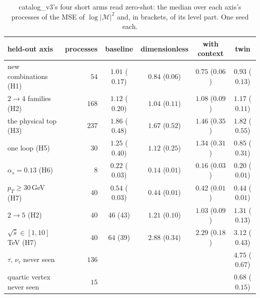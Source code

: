 \documentclass[11pt]{article}
\begin{document}
\begin{table}[H]
\centering
\caption{catalog\_v3's four short arms read zero-shot: the median over each axis's processes of the MSE of
$\log|\mathcal M|^2$ and, in brackets, of its level part. One seed each.}
\label{tab:v3_short}
\small
\begin{tabular}{lrcccc}
\hline
held-out axis & processes & baseline & dimensionless & with context & twin \\
\hline
new combinations (H1) & $54$ & $1.01$ ($0.17$) & $0.84$ ($0.06$) & $0.75$ ($0.06$) & $0.93$ ($0.13$) \\
$2\to4$ families (H2) & $168$ & $1.12$ ($0.20$) & $1.04$ ($0.11$) & $1.08$ ($0.09$) & $1.17$ ($0.11$) \\
the physical top (H3) & $237$ & $1.86$ ($0.48$) & $1.67$ ($0.52$) & $1.46$ ($0.35$) & $1.82$ ($0.55$) \\
one loop (H5) & $30$ & $1.25$ ($0.40$) & $1.12$ ($0.25$) & $1.34$ ($0.31$) & $0.85$ ($0.31$) \\
$\alpha_s=0.13$ (H6) & $8$ & $0.22$ ($0.03$) & $0.14$ ($0.01$) & $0.16$ ($0.03$) & $0.20$ ($0.01$) \\
$p_T\geq30$\,GeV (H7) & $40$ & $0.54$ ($0.03$) & $0.44$ ($0.01$) & $0.42$ ($0.01$) & $0.44$ ($0.01$) \\
$2\to5$ (H2) & $40$ & $46$ ($43$) & $1.21$ ($0.10$) & $1.03$ ($0.09$) & $1.31$ ($0.13$) \\
$\sqrt{\hat s}\in[1,10]$\,TeV (H7) & $40$ & $64$ ($39$) & $2.88$ ($0.34$) & $2.29$ ($0.18$) & $3.12$ ($0.43$) \\
$\tau$, $\nu_\tau$ never seen & $136$ & & & & $4.75$ ($0.67$) \\
quartic vertex never seen & $15$ & & & & $0.68$ ($0.15$) \\
\hline
\end{tabular}
\end{table}
\end{document}
